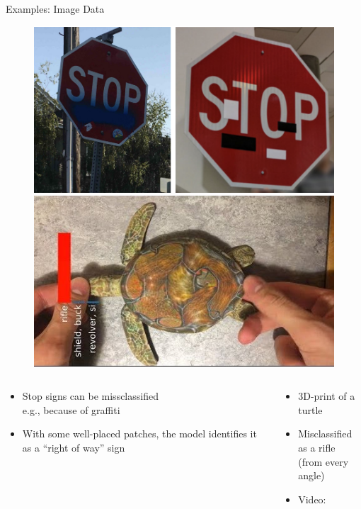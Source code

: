 \documentclass[10pt,compress,t,notes=noshow, xcolor=table]{beamer}
\begin{document}
\begin{frame}[c]{Examples: Image Data   }
\begin{figure}[h]
\centering
\includegraphics[width=0.46\linewidth]{figure/AEstop.png}\quad \includegraphics[width=0.45\linewidth]{figure/AEturtle.jpg}
  \label{fig:mnist}
\end{figure} 

\begin{columns}[totalwidth=\textwidth]

\begin{column}{0.5\textwidth}

\begin{itemize}
    \item Stop signs can be missclassified\\ e.g., because of graffiti
    \item With some well-placed patches, the model identifies it as a ``right of way'' sign
\end{itemize}

\end{column}

\begin{column}{0.5\textwidth}

\begin{itemize}
    \item 3D-print of a turtle
    \item Misclassified as a rifle\\(from every angle)
    \item Video: 
\end{itemize}

\end{column}

\end{columns}


\end{frame}
\end{document}

